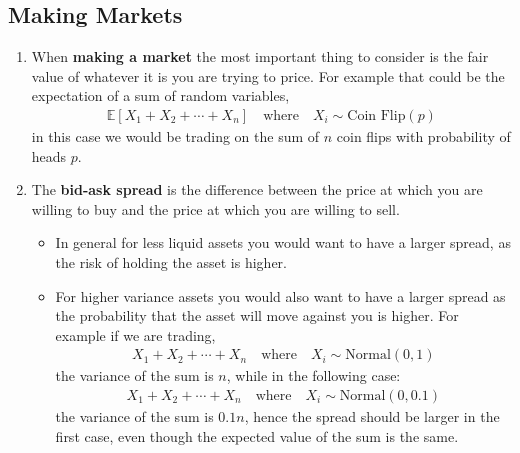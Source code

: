\documentclass[letterpaper, 11pt]{article}
\newcommand{\E}{\mathbb{E}}	%
\newcommand{\1}{\mathds{1}}	%
\theoremstyle{definition}
\begin{document}
\subsection{Making Markets}
\begin{enumerate}
    \item When \textbf{making a market} the most important thing to consider is the fair value of whatever
    it is you are trying to price. For example that could be the expectation of a sum of random variables,
    \begin{align}
        \E[X_1 + X_2 + \cdots + X_n] \quad \text{where} \quad X_i \sim \text{Coin Flip}(p)
    \end{align}
    in this case we would be trading on the sum of $n$ coin flips with probability of heads $p$.
    \item The \textbf{bid-ask spread} is the difference between the price at which you 
    are willing to buy and the price at which you are willing to sell. 
    \begin{itemize}
        \item In general for less liquid assets you would want to have a larger spread,
        as the risk of holding the asset is higher.
        \item For higher variance assets you would also want to have a larger spread as the 
        probability that the asset will move against you is higher. For example if we are trading,
        \begin{align}
            X_1 + X_2 + \cdots + X_n \quad \text{where} \quad X_i \sim \text{Normal}(0,1)
        \end{align}
        the variance of the sum is $n$, while in the following case:
        \begin{align}
            X_1 + X_2 + \cdots + X_n \quad \text{where} \quad X_i \sim \text{Normal}(0,0.1)
        \end{align}
        the variance of the sum is $0.1n$, hence the spread should be larger in the first case, even though 
        the expected value of the sum is the same.


\end{itemize}
\end{enumerate}
\end{document}
